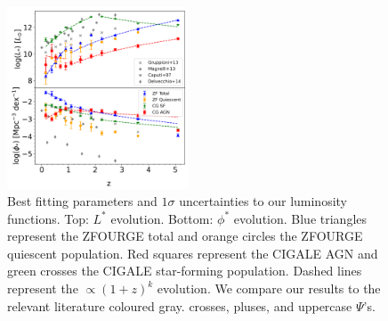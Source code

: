 \begin{figure}[h]
    \centering
    \includegraphics[width=0.48\textwidth]{Figures/Param Evo.png}
    \caption{Best fitting parameters and $1\sigma$ uncertainties to our luminosity functions. Top: $L^{*}$ evolution. Bottom: $\phi^{*}$ evolution. Blue triangles represent the ZFOURGE total and orange circles the ZFOURGE quiescent population. Red squares represent the CIGALE AGN and green crosses the CIGALE star-forming population. Dashed lines represent the $\propto(1+z)^k$ evolution. We compare our results to the relevant literature coloured gray. \cite{gruppioni_herschel_2013} crosses, \cite{magnelli_deepest_2013} pluses, and \cite{caputi_infrared_2007} uppercase $\Psi$'s.}
    \label{Fig: Param Evo}
\end{figure}

